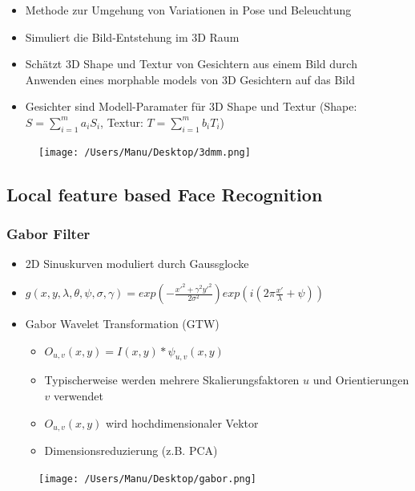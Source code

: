 \documentclass[paper=a4, fontsize=11pt]{scrartcl} %
\numberwithin{equation}{section} %
\numberwithin{figure}{section} %
\numberwithin{table}{section} %
\begin{document}
\begin{minipage}{0.55\textwidth}
\begin{itemize}
\item Methode zur Umgehung von Variationen in Pose und Beleuchtung
\item Simuliert die Bild-Entstehung im 3D Raum
\item Schätzt 3D Shape und Textur von Gesichtern aus einem Bild durch Anwenden eines morphable models von 3D Gesichtern auf das Bild
\item Gesichter sind Modell-Paramater für 3D Shape und Textur (Shape: $S = \sum\limits_{i=1}^m a_iS_i$, Textur: $T = \sum\limits_{i=1}^m b_iT_i$)
\end{itemize}
\end{minipage} \hfill
\begin{minipage}{0.4\textwidth}
\begin{figure}[H]
\texttt{[image: /Users/Manu/Desktop/3dmm.png]}
\end{figure}
\end{minipage}

\subsection{Local feature based Face Recognition}

\subsubsection{Gabor Filter}

\begin{minipage}{0.55\textwidth}
\begin{itemize}
\item 2D Sinuskurven moduliert durch Gaussglocke
\item $g(x,y, \lambda, \theta, \psi, \sigma, \gamma) = exp(-\frac{x'^2 + \gamma^2 y'^2}{2 \sigma^2}) exp (i(2\pi \frac{x'}{\lambda} + \psi)) $
\item Gabor Wavelet Transformation (GTW)
\begin{itemize}
\item $O_{u,v}(x,y) = I(x,y) * \psi_{u,v}(x,y)$
\item Typischerweise werden mehrere Skalierungsfaktoren $u$ und Orientierungen $v$ verwendet
\item $O_{u,v}(x,y)$ wird hochdimensionaler Vektor
\item Dimensionsreduzierung (z.B. PCA)
\end{itemize}
\end{itemize}
\end{minipage} \hfill
\begin{minipage}{0.4\textwidth}
\begin{figure}[H]
\texttt{[image: /Users/Manu/Desktop/gabor.png]}
\end{figure}
\end{minipage}
\end{document}
